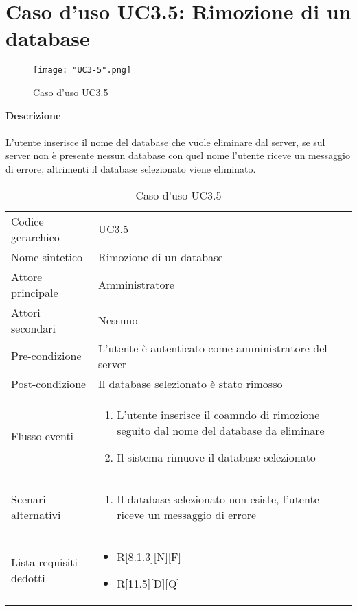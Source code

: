 \documentclass[a4paper]{report}
\begin{document}
	\section{Caso d'uso UC3.5: Rimozione di un database}
	 	\begin{figure}[H]
			\centering
			\texttt{[image: "UC3-5".png]}
			\caption{Caso d'uso UC3.5}
		\end{figure}
	 \textbf{Descrizione} \\ \\
	 L'utente inserisce il nome del database che vuole eliminare dal server, se sul server non è 
	 presente nessun database con quel nome l'utente riceve un messaggio di errore, altrimenti il database
	 selezionato viene eliminato.
		\begin{table}[H]
		\begin{tabularx}{\textwidth}{X | X}\toprule
			\rowcolor{orange!65}Codice gerarchico & UC3.5 \\
			Nome sintetico & Rimozione di un database \\
			\rowcolor{orange!65}Attore principale & Amministratore\\
			Attori secondari & Nessuno \\
			\rowcolor{orange!65}Pre-condizione & L'utente è autenticato come amministratore del server\\
			Post-condizione & Il database selezionato è stato rimosso \\
			\rowcolor{orange!65}Flusso eventi & \begin{enumerate}
			\item L'utente inserisce il coamndo di rimozione seguito dal nome del database da eliminare
			\item Il sistema rimuove il database selezionato
			\end{enumerate} \\
			Scenari alternativi & \begin{enumerate}
			\item Il database selezionato non esiste, l'utente riceve un messaggio di errore
			\end{enumerate} \\
			\rowcolor{orange!65}Lista requisiti dedotti & \begin{itemize}
				\item R[8.1.3][N][F]
				\item R[11.5][D][Q]
				\end{itemize} \\
			\bottomrule
		\end{tabularx}
		\caption{Caso d'uso UC3.5}
	 \end{table}
\end{document}
